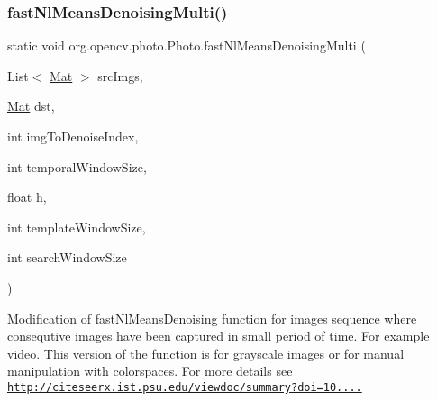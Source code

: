 \subsubsection{\texorpdfstring{fast\+Nl\+Means\+Denoising\+Multi()}{fastNlMeansDenoisingMulti()}\hspace{0.1cm}{\footnotesize\ttfamily [1/2]}}
{\footnotesize\ttfamily static void org.\+opencv.\+photo.\+Photo.\+fast\+Nl\+Means\+Denoising\+Multi (\begin{DoxyParamCaption}\item[{List$<$ \mbox{\hyperlink{classorg_1_1opencv_1_1core_1_1_mat}{Mat}} $>$}]{src\+Imgs,  }\item[{\mbox{\hyperlink{classorg_1_1opencv_1_1core_1_1_mat}{Mat}}}]{dst,  }\item[{int}]{img\+To\+Denoise\+Index,  }\item[{int}]{temporal\+Window\+Size,  }\item[{float}]{h,  }\item[{int}]{template\+Window\+Size,  }\item[{int}]{search\+Window\+Size }\end{DoxyParamCaption})\hspace{0.3cm}{\ttfamily [static]}}

Modification of {\ttfamily fast\+Nl\+Means\+Denoising} function for images sequence where consequtive images have been captured in small period of time. For example video. This version of the function is for grayscale images or for manual manipulation with colorspaces. For more details see \href{http://citeseerx.ist.psu.edu/viewdoc/summary?doi=10.1.1.131.6394}{\tt http\+://citeseerx.\+ist.\+psu.\+edu/viewdoc/summary?doi=10....}


